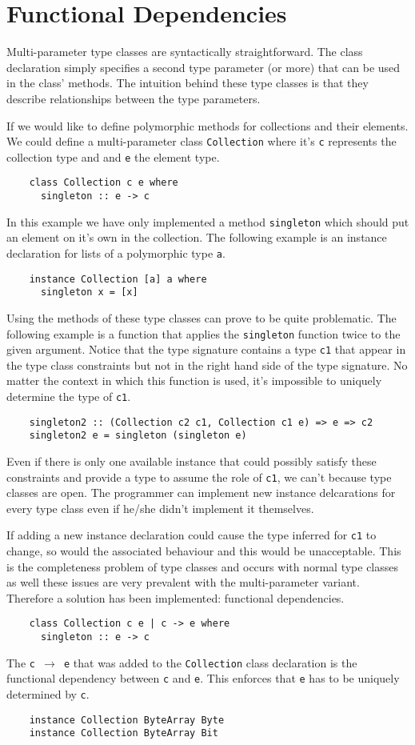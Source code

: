 \section{Functional Dependencies}
Multi-parameter type classes are syntactically straightforward. The class
declaration simply specifies a second type parameter (or more) that can be used
in the class' methods. The intuition behind these type classes is that they
describe relationships between the type parameters.

If we would like to define polymorphic methods for collections and their
elements. We could define a multi-parameter class \texttt{Collection} where it's
\texttt{c} represents the collection type and and \texttt{e} the element type.
\begin{verbatim}
    class Collection c e where
      singleton :: e -> c
\end{verbatim}
In this example we have only implemented a method \texttt{singleton} which
should put an element on it's own in the collection.
The following example is an instance declaration for lists of a polymorphic type
\texttt{a}.
\begin{verbatim}
    instance Collection [a] a where
      singleton x = [x]
\end{verbatim}

Using the methods of these type classes can prove to be quite problematic. The
following example is a function that applies the \texttt{singleton} function
twice to the given argument. Notice that the type signature contains a type
\texttt{c1} that appear in the type class constraints but not in the right hand
side of the type signature. No matter the context in which this function is
used, it's impossible to uniquely determine the type of \texttt{c1}.

\begin{verbatim}
    singleton2 :: (Collection c2 c1, Collection c1 e) => e => c2
    singleton2 e = singleton (singleton e)
\end{verbatim}

Even if there is only one available instance that could possibly satisfy these
constraints and provide a type to assume the role of \texttt{c1}, we can't
because type classes are open. The programmer can implement new instance
delcarations for every type class even if he/she didn't implement it themselves.

If adding a new instance declaration could cause the type inferred for
\texttt{c1} to change, so would the associated behaviour and this would be
unacceptable. This is the completeness problem of type classes and occurs with
normal type classes as well these issues  are very prevalent with the
multi-parameter variant. Therefore a solution has been implemented: functional
dependencies.
\begin{verbatim}
    class Collection c e | c -> e where
      singleton :: e -> c
\end{verbatim}
The \texttt{c $\rightarrow$ e} that was added to the \texttt{Collection} class
declaration is the functional dependency between \texttt{c} and \texttt{e}. This
enforces that \texttt{e} has to be uniquely determined by \texttt{c}.

\begin{verbatim}
    instance Collection ByteArray Byte
    instance Collection ByteArray Bit
\end{verbatim}
